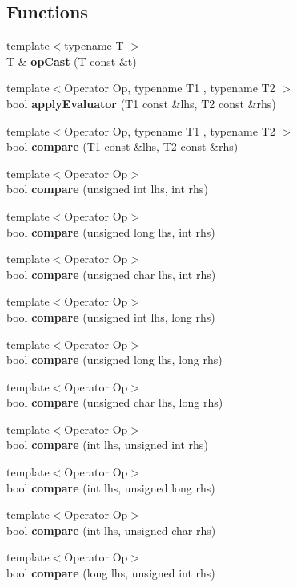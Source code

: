 \subsection*{Functions}
\begin{DoxyCompactItemize}
\item 
{\footnotesize template$<$typename T $>$ }\\T \& \textbf{ op\+Cast} (T const \&t)
\item 
{\footnotesize template$<$Operator Op, typename T1 , typename T2 $>$ }\\bool \textbf{ apply\+Evaluator} (T1 const \&lhs, T2 const \&rhs)
\item 
{\footnotesize template$<$Operator Op, typename T1 , typename T2 $>$ }\\bool \textbf{ compare} (T1 const \&lhs, T2 const \&rhs)
\item 
{\footnotesize template$<$Operator Op$>$ }\\bool \textbf{ compare} (unsigned int lhs, int rhs)
\item 
{\footnotesize template$<$Operator Op$>$ }\\bool \textbf{ compare} (unsigned long lhs, int rhs)
\item 
{\footnotesize template$<$Operator Op$>$ }\\bool \textbf{ compare} (unsigned char lhs, int rhs)
\item 
{\footnotesize template$<$Operator Op$>$ }\\bool \textbf{ compare} (unsigned int lhs, long rhs)
\item 
{\footnotesize template$<$Operator Op$>$ }\\bool \textbf{ compare} (unsigned long lhs, long rhs)
\item 
{\footnotesize template$<$Operator Op$>$ }\\bool \textbf{ compare} (unsigned char lhs, long rhs)
\item 
{\footnotesize template$<$Operator Op$>$ }\\bool \textbf{ compare} (int lhs, unsigned int rhs)
\item 
{\footnotesize template$<$Operator Op$>$ }\\bool \textbf{ compare} (int lhs, unsigned long rhs)
\item 
{\footnotesize template$<$Operator Op$>$ }\\bool \textbf{ compare} (int lhs, unsigned char rhs)
\item 
{\footnotesize template$<$Operator Op$>$ }\\bool \textbf{ compare} (long lhs, unsigned int rhs)

\end{DoxyCompactItemize}
